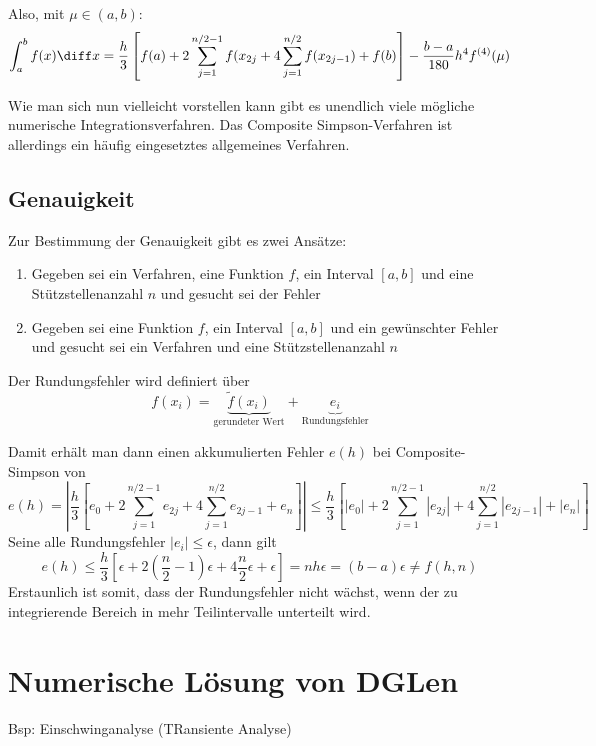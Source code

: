 Also, mit $\mu \in (a, b)$:
\begin{equation}
	\int_a^b f(x) \diff x = \frac{h}{3} \left[ f(a) + 2 \sum_{j = 1}^{n/2 - 1} f(x_{2j} + 4 \sum_{j = 1}^{n/2} f(x_{2j - 1}) + f(b) \right] - \frac{b - a}{180} h^4 f^{(4)}(\mu)
\end{equation}

Wie man sich nun vielleicht vorstellen kann gibt es unendlich viele mögliche numerische Integrationsverfahren. Das Composite Simpson-Verfahren ist allerdings ein häufig eingesetztes allgemeines Verfahren.

\subsection{Genauigkeit}
Zur Bestimmung der Genauigkeit gibt es zwei Ansätze:
\begin{enumerate}
	\item Gegeben sei ein Verfahren, eine Funktion $f$, ein Interval $[a, b]$ und eine Stützstellenanzahl $n$ und gesucht sei der Fehler
	\item Gegeben sei eine Funktion $f$, ein Interval $[a, b]$ und ein gewünschter Fehler und gesucht sei ein Verfahren und eine Stützstellenanzahl $n$
\end{enumerate}

Der Rundungsfehler wird definiert über
\begin{equation}
	f(x_i) = \underbrace{\tilde{f}(x_i)}_{\text{gerundeter Wert}} + \underbrace{e_i}_{\text{Rundungsfehler}}
\end{equation}

Damit erhält man dann einen akkumulierten Fehler $e(h)$ bei Composite-Simpson von
\begin{equation}
	e(h) = \left| \frac{h}{3} \left[ e_0 + 2 \sum_{j = 1}^{n/2 - 1} e_{2j} + 4 \sum_{j = 1}^{n/2} e_{2j - 1} + e_n \right] \right| \le \frac{h}{3} \left[ |e_0| + 2 \sum_{j = 1}^{n/2 - 1} |e_{2j}| + 4 \sum_{j = 1}^{n/2} |e_{2j - 1}| + |e_n| \right]
\end{equation}
Seine alle Rundungsfehler $|e_i| \le \epsilon$, dann gilt
\begin{equation}
	e(h) \le \frac{h}{3} \left[ \epsilon + 2(\frac{n}{2} - 1) \epsilon + 4 \frac{n}{2} \epsilon + \epsilon \right] = n h \epsilon = (b - a) \epsilon \ne f(h, n)
\end{equation}
Erstaunlich ist somit, dass der Rundungsfehler nicht wächst, wenn der zu integrierende Bereich in mehr Teilintervalle unterteilt wird. 

\section{Numerische Lösung von DGLen}
Bsp: Einschwinganalyse (TRansiente Analyse)

